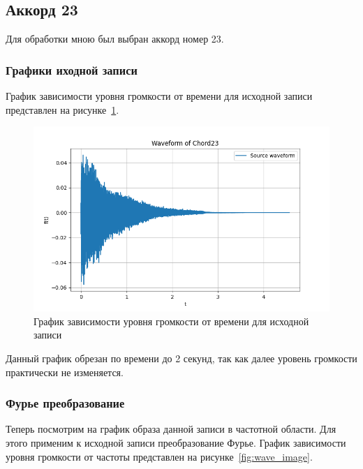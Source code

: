 \subsection{Аккорд 23}

Для обработки мною был выбран аккорд номер 23. 

\subsubsection{Графики иходной записи}

График зависимости уровня громкости от времени для исходной записи представлен на рисунке~\ref{fig:waveform}.

\begin{figure}[ht!]
    \centering
    \includegraphics[width=\textwidth]{media/waveform.png}
    \caption{График зависимости уровня громкости от времени для исходной записи}
    \label{fig:waveform}
\end{figure}

Данный график обрезан по времени до 2 секунд, так как далее уровень громкости практически не изменяется.

\subsubsection{Фурье преобразование}
Теперь посмотрим на график образа данной записи в частотной области. Для этого применим к исходной записи преобразование Фурье. График зависимости уровня громкости от частоты представлен на рисунке~\ref{fig:wave_image}.

